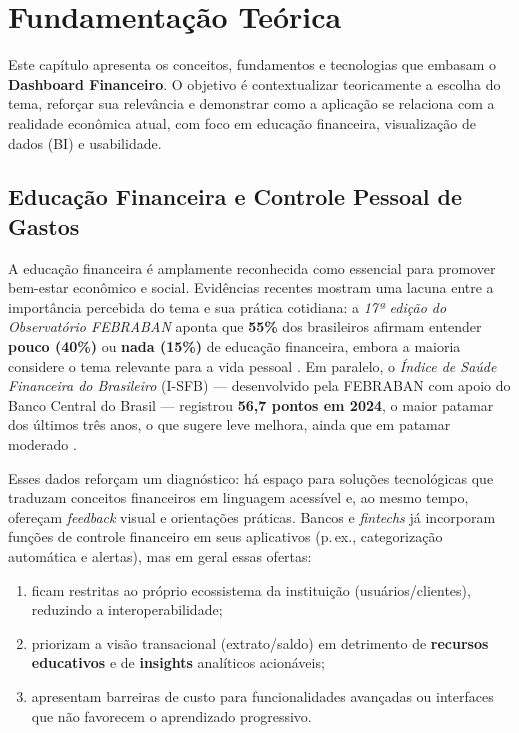\chapter{\label{chap:chap2}Fundamentação Teórica}

Este capítulo apresenta os conceitos, fundamentos e tecnologias que embasam o \textbf{Dashboard Financeiro}. O objetivo é contextualizar teoricamente a escolha do tema, reforçar sua relevância e demonstrar como a aplicação se relaciona com a realidade econômica atual, com foco em educação financeira, visualização de dados (BI) e usabilidade.

\section{Educação Financeira e Controle Pessoal de Gastos}
A educação financeira é amplamente reconhecida como essencial para promover bem-estar econômico e social. Evidências recentes mostram uma lacuna entre a importância percebida do tema e sua prática cotidiana: a \textit{17ª edição do Observatório FEBRABAN} aponta que \textbf{55\%} dos brasileiros afirmam entender \textbf{pouco (40\%)} ou \textbf{nada (15\%)} de educação financeira, embora a maioria considere o tema relevante para a vida pessoal \cite{FEBRABAN2025}. Em paralelo, o \textit{Índice de Saúde Financeira do Brasileiro} (I-SFB) --- desenvolvido pela FEBRABAN com apoio do Banco Central do Brasil --- registrou \textbf{56{,}7 pontos em 2024}, o maior patamar dos últimos três anos, o que sugere leve melhora, ainda que em patamar moderado \cite{BCB2024,ISFB2024}.

Esses dados reforçam um diagnóstico: há espaço para soluções tecnológicas que traduzam conceitos financeiros em linguagem acessível e, ao mesmo tempo, ofereçam \textit{feedback} visual e orientações práticas. Bancos e \textit{fintechs} já incorporam funções de controle financeiro em seus aplicativos (p.\,ex., categorização automática e alertas), mas em geral essas ofertas:
\begin{enumerate}
    \item ficam restritas ao próprio ecossistema da instituição (usuários/clientes), reduzindo a interoperabilidade;
    \item priorizam a visão transacional (extrato/saldo) em detrimento de \textbf{recursos educativos} e de \textbf{insights} analíticos acionáveis;
    \item apresentam barreiras de custo para funcionalidades avançadas ou interfaces que não favorecem o aprendizado progressivo.
\end{enumerate}

